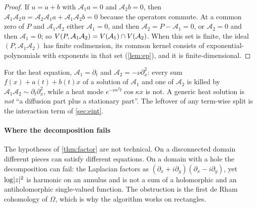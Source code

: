 \begin{proof}
If $u=a+b$ with $\mathcal A_1a=0$ and $\mathcal A_2b=0$, then $\mathcal A_1\mathcal A_2u=\mathcal A_2\mathcal A_1a+\mathcal A_1\mathcal A_2b=0$ because the operators commute.
At a common zero of $P$ and $\mathcal A_1\mathcal A_2$ either $\mathcal A_1=0$, and then $\mathcal A_2=P-\mathcal A_1=0$, or $\mathcal A_2=0$ and then
$\mathcal A_1=0$; so $V(P,\mathcal A_1\mathcal A_2)=V(\mathcal A_1)\cap V(\mathcal A_2)$. When this set is finite, the ideal $(P,\mathcal A_1\mathcal A_2)$
has finite codimension, its common kernel consists of exponential-polynomials with exponents in that
set (\cref{lem:ep}), and it is finite-dimensional.
\end{proof}

For the heat equation, $\mathcal A_1=\partial_t$ and $\mathcal A_2=-\nu\partial_x^2$: every sum $f(x)+a(t)+b(t)x$ of a
solution of $\mathcal A_1$ and one of $\mathcal A_2$ is killed by $\mathcal A_1\mathcal A_2\sim\partial_t\partial_x^2$, while a heat mode
$e^{-\nu\kappa^2t}\cos\kappa x$ is not. A generic heat solution is \emph{not} ``a diffusion part plus a
stationary part''. The leftover of any term-wise split is the interaction term of
\cref{sec:eint}.

\paragraph{Where the decomposition fails}
The hypotheses of \cref{thm:factor} are not technical. On a disconnected domain different pieces
can satisfy different equations. On a domain with a hole the decomposition can fail: the Laplacian
factors as $(\partial_x+i\partial_y)(\partial_x-i\partial_y)$, yet $\log\lvert z\rvert^2$ is harmonic on an annulus
and is not a sum of a holomorphic and an antiholomorphic single-valued function. The obstruction is
the first de Rham cohomology of $\Omega$, which is why the algorithm works on rectangles.

